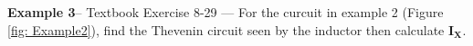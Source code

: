 \documentclass{handout}
\begin{document}
 \textbf{Example  3}-- Textbook Exercise 8-29 --- For the curcuit in example 2 (Figure \ref{fig: Example2}), find the  Thevenin circuit seen by the inductor then calculate $\mathbf{I_X}$.

\end{document}
